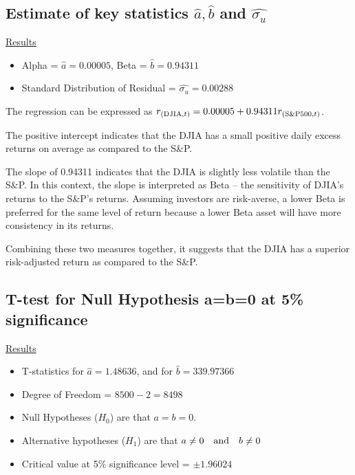 \documentclass[a4paper]{article}
\begin{document}
	\subsection{Estimate of key statistics $\hat{a},\hat{b}$ and $\hat{\sigma_{u}}$}
	\underline{Results}
	\begin{itemize}[nosep]
		\item Alpha = $\hat{a} = 0.00005$, Beta = $\hat{b} = 0.94311$
		\item Standard Distribution of Residual = $\hat{\sigma_{u}} = 0.00288$
	\end{itemize}

	The regression can be expressed as $r_{(\textnormal{DJIA}, t)} = 0.00005 +  0.94311 r_{(\textnormal{S\&P500}, t)}$.
	
	The positive intercept indicates that the DJIA has a small positive daily excess returns on average as compared to the S\&P. 
	
	The slope of 0.94311 indicates that the DJIA is slightly less volatile than the S\&P. In this context, the slope is interpreted as Beta – the sensitivity of DJIA’s returns to the S\&P’s returns. Assuming investors are risk-averse, a lower Beta is preferred for the same level of return because a lower Beta asset will have more consistency in its returns.
	  
	Combining these two measures together, it suggests that the DJIA has a superior risk-adjusted return as compared to the S\&P. 
	
	
	\subsection{T-test for Null Hypothesis a=b=0 at 5\% significance}
	\underline{Results}
	\begin{itemize}[nosep]
		\item T-statistics for $\hat{a} = 1.48636$, and for $\hat{b} = 339.97366$
		\item Degree of Freedom = $8500 - 2 = 8498$
		\item Null Hypotheses ($H_0$) are that $a=b=0$.
		\item Alternative hypotheses ($H_1$) are that $a\ne 0 \quad \textnormal{and} \quad b\ne 0$
		\item Critical value at 5\% significance level = $\pm1.96024$
	\end{itemize}
	

	
\end{document}
